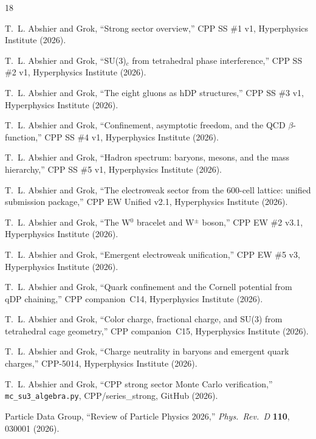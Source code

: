 \documentclass[11pt,a4paper]{article}
\begin{document}

\begin{thebibliography}{18}

T.~L. Abshier and Grok,
``Strong sector overview,''
CPP SS \#1 v1, Hyperphysics Institute (2026).

T.~L. Abshier and Grok,
``SU(3)$_c$ from tetrahedral phase interference,''
CPP SS \#2 v1, Hyperphysics Institute (2026).

T.~L. Abshier and Grok,
``The eight gluons as hDP structures,''
CPP SS \#3 v1, Hyperphysics Institute (2026).

T.~L. Abshier and Grok,
``Confinement, asymptotic freedom, and the QCD $\beta$-function,''
CPP SS \#4 v1, Hyperphysics Institute (2026).

T.~L. Abshier and Grok,
``Hadron spectrum: baryons, mesons, and the mass hierarchy,''
CPP SS \#5 v1, Hyperphysics Institute (2026).

T.~L. Abshier and Grok,
``The electroweak sector from the 600-cell lattice: unified
submission package,''
CPP EW Unified v2.1, Hyperphysics Institute (2026).

T.~L. Abshier and Grok,
``The W$^0$ bracelet and W$^\pm$ boson,''
CPP EW \#2 v3.1, Hyperphysics Institute (2026).

T.~L. Abshier and Grok,
``Emergent electroweak unification,''
CPP EW \#5 v3, Hyperphysics Institute (2026).

T.~L. Abshier and Grok,
``Quark confinement and the Cornell potential from qDP chaining,''
CPP companion~C14, Hyperphysics Institute (2026).

T.~L. Abshier and Grok,
``Color charge, fractional charge, and SU(3) from tetrahedral cage
geometry,''
CPP companion~C15, Hyperphysics Institute (2026).

T.~L. Abshier and Grok,
``Charge neutrality in baryons and emergent quark charges,''
CPP-5014, Hyperphysics Institute (2026).

T.~L. Abshier and Grok,
``CPP strong sector Monte Carlo verification,''
\texttt{mc\_su3\_algebra.py},
CPP/series\_strong, GitHub (2026).

Particle Data Group,
``Review of Particle Physics 2026,''
\textit{Phys.\ Rev.\ D} \textbf{110}, 030001 (2026).


\end{thebibliography}
\end{document}
